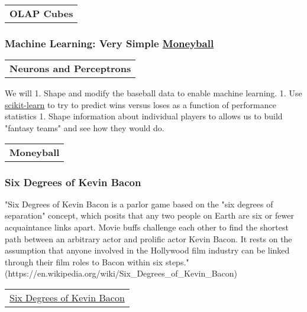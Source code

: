 \documentclass[11pt]{article}
\begin{document}
\begin{longtable}[]{@{}c@{}}
\toprule
\tabularnewline
\midrule
\endhead
\textbf{OLAP Cubes}\tabularnewline
\bottomrule
\end{longtable}

    \subsubsection{\texorpdfstring{Machine Learning: Very Simple
\href{https://en.wikipedia.org/wiki/Moneyball}{Moneyball}}{Machine Learning: Very Simple Moneyball}}\label{machine-learning-very-simple-moneyball}

    \begin{longtable}[]{@{}c@{}}
\toprule
\tabularnewline
\midrule
\endhead
\textbf{Neurons and Perceptrons}\tabularnewline
\bottomrule
\end{longtable}

    We will 1. Shape and modify the baseball data to enable machine
learning. 1. Use \href{http://scikit-learn.org/stable/}{scikit-learn} to
try to predict wins versus loses as a function of performance statistics
1. Shape information about individual players to allows us to build
"fantasy teams" and see how they would do.

\begin{longtable}[]{@{}c@{}}
\toprule
\tabularnewline
\midrule
\endhead
\textbf{Moneyball}\tabularnewline
\bottomrule
\end{longtable}

    \subsubsection{Six Degrees of Kevin
Bacon}\label{six-degrees-of-kevin-bacon}

"Six Degrees of Kevin Bacon is a parlor game based on the "six degrees
of separation" concept, which posits that any two people on Earth are
six or fewer acquaintance links apart. Movie buffs challenge each other
to find the shortest path between an arbitrary actor and prolific actor
Kevin Bacon. It rests on the assumption that anyone involved in the
Hollywood film industry can be linked through their film roles to Bacon
within six steps."
(https://en.wikipedia.org/wiki/Six\_Degrees\_of\_Kevin\_Bacon)

\begin{longtable}[]{@{}c@{}}
\toprule
\tabularnewline
\midrule
\endhead
\href{http://www.markrobinsonwrites.com/the-music-that-makes-me-dance/2018/3/11/movie-morsel-six-degrees-of-kevin-bacon}{Six
Degrees of Kevin Bacon}\tabularnewline
\bottomrule
\end{longtable}
\end{document}
